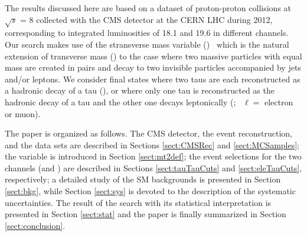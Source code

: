 The results discussed here are based on a dataset of proton-proton 
collisions at $\sqrt{s}$ = 8\TeV
collected with the CMS detector at the CERN LHC during 2012, corresponding to integrated
luminosities of 18.1 and 19.6 \invfb in different channels. 
Our search makes use of the stransverse mass variable (\mttwo)~\cite{Lester:1999tx,Barr:2003rg}
which is the natural extension of transverse mass (\mt) to the case 
where two massive particles with equal mass are created in pairs and decay 
to two invisible particles accompanied by jets and/or leptons.  We consider final states where
two taus are each reconstructed as a hadronic decay of a tau (\tauTau), or where only one tau is reconstructed as the hadronic 
decay of a tau and the other one decays leptonically (\leptonTau;~ $\ell=$ electron or muon).

The paper is organized as follows.  The CMS detector, the event reconstruction, and the data sets are described
in Sections \ref{sect:CMSRec} and \ref{sect:MCSamples}; the \mttwo variable is introduced in Section \ref{sect:mt2def}; 
the event selections for the two channels (\tauTau and \leptonTau)
are described in Sections \ref{sect:tauTauCuts} and \ref{sect:eleTauCuts}, respectively;
a detailed study of the SM backgrounds is presented in Section \ref{sect:bkg}, while Section \ref{sect:sys} 
is devoted to the description of the systematic uncertainties.  The result of the search with its statistical interpretation is presented in 
Section \ref{sect:stat}  
and the paper is finally summarized in Section \ref{sect:conclusion}.





